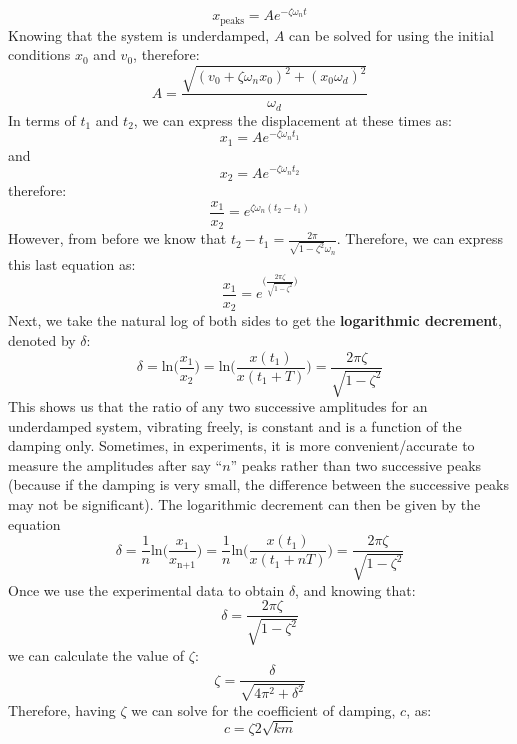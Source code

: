 \documentclass[12pt,a4paper]{article}
\begin{document}
			\begin{equation}
				x_{\text{peaks}} = Ae^{-\zeta\omega_nt} 
			\end{equation} 		
			Knowing that the system is underdamped, $A$ can be solved for using the initial conditions $x_0$ and $v_0$, therefore: 
			\begin{equation}
				A = \frac{\sqrt{(v_0+\zeta\omega_nx_0)^2 + (x_0\omega_d)^2}}{\omega_d}
			\end{equation} 	
			In terms of $t_1$ and $t_2$, we can express the displacement at these times as:
			\begin{equation}
				x_{\text{1}} = A e^{-\zeta \omega_n t_1}
			\end{equation}				
			and 
			\begin{equation}
				x_{\text{2}} = A e^{-\zeta \omega_n t_2}
			\end{equation}		
			therefore:
			\begin{equation}
				\frac{x_{\text{1}}}{x_{\text{2}}} = e^{\zeta \omega_n(t_2-t_1)}
			\end{equation}		
			However, from before we know that $t_2-t_1 = \frac{2\pi}{\sqrt{1-\zeta^2}\omega_n}$. Therefore, we can express this last equation as:
			\begin{equation}
				\frac{x_{\text{1}}}{x_{\text{2}}} =e^{\Big(\frac{2 \pi \zeta}{\sqrt{1-\zeta^2}}\Big)}
			\end{equation}			
			Next, we take the natural log of both sides to get the \textbf{logarithmic decrement}, denoted by $\delta$:
			\begin{equation}
				\delta = \text{ln}\bigg(\frac{x_{\text{1}}}{x_{\text{2}}}\bigg) = \text{ln}\bigg(\frac{x(t_{\text{1}})}{x(t_{\text{1}}+T)}\bigg) = \frac{2 \pi \zeta}{\sqrt{1-\zeta^2}}
			\end{equation}				
			This shows us that the ratio of any two successive amplitudes for an underdamped system, vibrating freely, is constant and is a function of the damping only. Sometimes, in experiments, it is more convenient/accurate to measure the amplitudes after say ``$n$'' peaks rather than two successive peaks (because if the damping is very small, the difference between the successive
			peaks may not be significant). The logarithmic decrement can then be given by the equation
			\begin{equation}
				\delta = \frac{1}{n}\text{ln}\bigg(\frac{x_{\text{1}}}{x_{\text{n+1}}}\bigg) =   \frac{1}{n}\text{ln}\bigg(\frac{x(t_{\text{1}})}{x(t_{\text{1}}+nT)}\bigg) = \frac{2 \pi \zeta}{\sqrt{1-\zeta^2}}
			\end{equation}				
			Once we use the experimental data to obtain $\delta$, and knowing that:
			\begin{equation}
				\delta = \frac{2 \pi \zeta}{\sqrt{1-\zeta^2}}
			\end{equation}	
			we can calculate the value of $\zeta$:
			\begin{equation}
				\zeta = \frac{\delta}{\sqrt{4\pi^2+\delta^2}}
			\end{equation}
			Therefore, having $\zeta$ we can solve for the coefficient of damping, $c$, as: 
			\begin{equation}
				c = \zeta 2\sqrt{km}
			\end{equation}					
			
\end{document}
